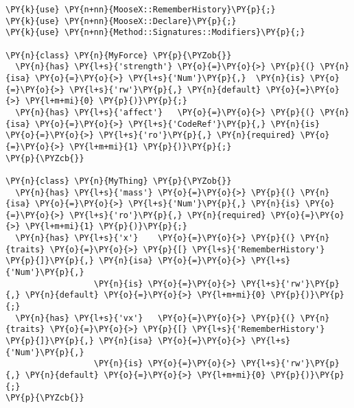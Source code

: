 \begin{Verbatim}[commandchars=\\\{\}]
\PY{k}{use} \PY{n+nn}{MooseX::RememberHistory}\PY{p}{;}
\PY{k}{use} \PY{n+nn}{MooseX::Declare}\PY{p}{;}
\PY{k}{use} \PY{n+nn}{Method::Signatures::Modifiers}\PY{p}{;}

\PY{n}{class} \PY{n}{MyForce} \PY{p}{\PYZob{}}
  \PY{n}{has} \PY{l+s}{'strength'} \PY{o}{=}\PY{o}{>} \PY{p}{(} \PY{n}{isa} \PY{o}{=}\PY{o}{>} \PY{l+s}{'Num'}\PY{p}{,}  \PY{n}{is} \PY{o}{=}\PY{o}{>} \PY{l+s}{'rw'}\PY{p}{,} \PY{n}{default} \PY{o}{=}\PY{o}{>} \PY{l+m+mi}{0} \PY{p}{)}\PY{p}{;}
  \PY{n}{has} \PY{l+s}{'affect'}   \PY{o}{=}\PY{o}{>} \PY{p}{(} \PY{n}{isa} \PY{o}{=}\PY{o}{>} \PY{l+s}{'CodeRef'}\PY{p}{,} \PY{n}{is} \PY{o}{=}\PY{o}{>} \PY{l+s}{'ro'}\PY{p}{,} \PY{n}{required} \PY{o}{=}\PY{o}{>} \PY{l+m+mi}{1} \PY{p}{)}\PY{p}{;} 
\PY{p}{\PYZcb{}}

\PY{n}{class} \PY{n}{MyThing} \PY{p}{\PYZob{}}
  \PY{n}{has} \PY{l+s}{'mass'} \PY{o}{=}\PY{o}{>} \PY{p}{(} \PY{n}{isa} \PY{o}{=}\PY{o}{>} \PY{l+s}{'Num'}\PY{p}{,} \PY{n}{is} \PY{o}{=}\PY{o}{>} \PY{l+s}{'ro'}\PY{p}{,} \PY{n}{required} \PY{o}{=}\PY{o}{>} \PY{l+m+mi}{1} \PY{p}{)}\PY{p}{;}
  \PY{n}{has} \PY{l+s}{'x'}    \PY{o}{=}\PY{o}{>} \PY{p}{(} \PY{n}{traits} \PY{o}{=}\PY{o}{>} \PY{p}{[} \PY{l+s}{'RememberHistory'} \PY{p}{]}\PY{p}{,} \PY{n}{isa} \PY{o}{=}\PY{o}{>} \PY{l+s}{'Num'}\PY{p}{,} 
                  \PY{n}{is} \PY{o}{=}\PY{o}{>} \PY{l+s}{'rw'}\PY{p}{,} \PY{n}{default} \PY{o}{=}\PY{o}{>} \PY{l+m+mi}{0} \PY{p}{)}\PY{p}{;}
  \PY{n}{has} \PY{l+s}{'vx'}   \PY{o}{=}\PY{o}{>} \PY{p}{(} \PY{n}{traits} \PY{o}{=}\PY{o}{>} \PY{p}{[} \PY{l+s}{'RememberHistory'} \PY{p}{]}\PY{p}{,} \PY{n}{isa} \PY{o}{=}\PY{o}{>} \PY{l+s}{'Num'}\PY{p}{,}
                  \PY{n}{is} \PY{o}{=}\PY{o}{>} \PY{l+s}{'rw'}\PY{p}{,} \PY{n}{default} \PY{o}{=}\PY{o}{>} \PY{l+m+mi}{0} \PY{p}{)}\PY{p}{;}
\PY{p}{\PYZcb{}}
\end{Verbatim}
